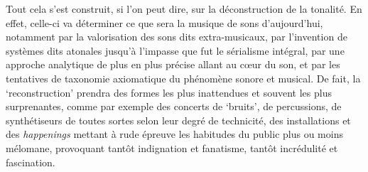 \documentclass{article}
\begin{document}
Tout cela s'est construit, si l'on peut dire, sur la déconstruction de la tonalité. En effet, celle-ci va déterminer ce que sera la musique de sons d'aujourd'hui, notamment  par la valorisation des sons dits extra-musicaux, par l'invention de systèmes dits atonales jusqu'à l'impasse que fut le sérialisme intégral, par une approche analytique de plus en plus précise allant au cœur du son, et par les tentatives de taxonomie axiomatique du phénomène sonore et musical. De fait, la `reconstruction' prendra des formes les plus inattendues et souvent les plus surprenantes, comme par exemple des concerts de `bruits', de percussions, de synthétiseurs de toutes sortes selon leur degré de technicité, des installations et des \textit{happenings} mettant à rude épreuve les habitudes du public plus ou moins mélomane, provoquant tantôt indignation et fanatisme, tantôt incrédulité et fascination. 


\bigskip
\end{document}
